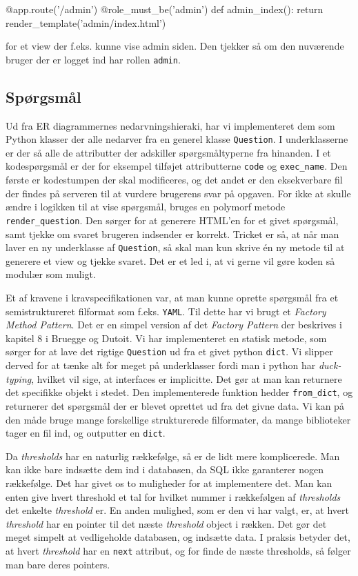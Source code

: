 \documentclass[11pt, a4paper]{article}
\begin{document}
\begin{python}
@app.route('/admin')
@role_must_be('admin')
def admin_index():
    return render_template('admin/index.html')
\end{python}

for et view der f.eks. kunne vise admin siden. Den tjekker så om den nuværende bruger der er logget ind har rollen \verb!admin!.

\subsection{Spørgsmål}
\label{sub:sporgsmal}
Ud fra ER diagrammernes nedarvningshieraki, har vi implementeret dem som Python klasser der alle nedarver fra en generel klasse \verb!Question!. I underklasserne er der så alle de attributter der adskiller spørgsmåltyperne fra hinanden. I et kodespørgsmål er der for eksempel tilføjet attributterne \verb!code! og \verb!exec_name!. Den første er kodestumpen der skal modificeres, og det andet er den eksekverbare fil der findes på serveren til at vurdere brugerens svar på opgaven. For ikke at skulle ændre i logikken til at vise spørgsmål, bruges en polymorf metode \verb!render_question!. Den sørger for at generere HTML'en for et givet spørgsmål, samt tjekke om svaret brugeren indsender er korrekt. Tricket er så, at når man laver en ny underklasse af \verb!Question!, så skal man kun skrive én ny metode til at generere et view og tjekke svaret. Det er et led i, at vi gerne vil gøre koden så modulær som muligt.

Et af kravene i kravspecifikationen var, at man kunne oprette spørgsmål fra et semistruktureret filformat som f.eks. \verb!YAML!. Til dette har vi brugt et \emph{Factory Method Pattern}. Det er en simpel version af det \emph{Factory Pattern} der beskrives i kapitel 8 i Bruegge og Dutoit\cite{OOSE}. Vi har implementeret en statisk metode, som sørger for at lave det rigtige \verb!Question! ud fra et givet python \verb!dict!. Vi slipper derved for at tænke alt for meget på underklasser fordi man i python har \emph{duck-typing}, hvilket vil sige, at interfaces er implicitte. Det gør at man kan returnere det specifikke objekt i stedet. Den implementerede funktion hedder \verb!from_dict!, og returnerer det spørgsmål der er blevet oprettet ud fra det givne data. Vi kan på den måde bruge mange forskellige strukturerede filformater, da mange biblioteker tager en fil ind, og outputter en \verb!dict!.

Da \emph{thresholds} har en naturlig rækkefølge, så er de lidt mere komplicerede. Man kan ikke bare indsætte dem ind i databasen, da SQL ikke garanterer nogen rækkefølge. Det har givet os to muligheder for at implementere det. Man kan enten give hvert threshold et tal for hvilket nummer i rækkefølgen af \emph{thresholds} det enkelte \emph{threshold} er. En anden mulighed, som er den vi har valgt, er, at hvert \emph{threshold} har en pointer til det næste \emph{threshold} object i rækken. Det gør det meget simpelt at vedligeholde databasen, og indsætte data. I praksis betyder det, at hvert \emph{threshold} har en \verb!next! attribut, og for finde de næste thresholds, så følger man bare deres pointers.
\end{document}
